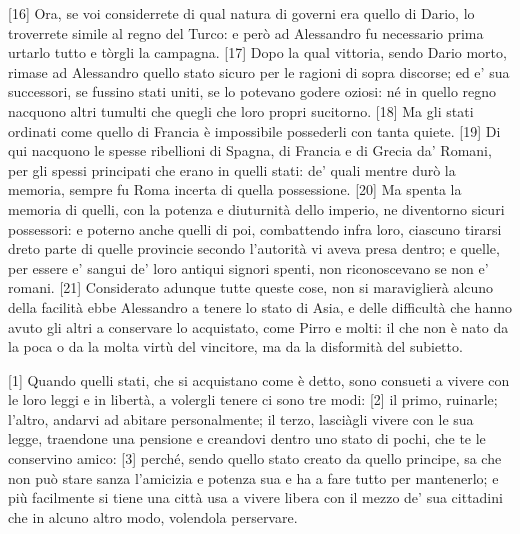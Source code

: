 {[}16{]} Ora, se voi considerrete di qual natura di governi era quello
di Dario, lo troverrete simile al regno del Turco: e però ad Alessandro
fu necessario prima urtarlo tutto e tòrgli la campagna. {[}17{]} Dopo la
qual vittoria, sendo Dario morto, rimase ad Alessandro quello stato
sicuro per le ragioni di sopra discorse; ed e' sua successori, se
fussino stati uniti, se lo potevano godere oziosi: né in quello regno
nacquono altri tumulti che quegli che loro propri sucitorno. {[}18{]} Ma
gli stati ordinati come quello di Francia è impossibile possederli con
tanta quiete. {[}19{]} Di qui nacquono le spesse ribellioni di Spagna,
di Francia e di Grecia da' Romani, per gli spessi principati che erano
in quelli stati: de' quali mentre durò la memoria, sempre fu Roma
incerta di quella possessione. {[}20{]} Ma spenta la memoria di quelli,
con la potenza e diuturnità dello imperio, ne diventorno sicuri
possessori: e poterno anche quelli di poi, combattendo infra loro,
ciascuno tirarsi dreto parte di quelle provincie secondo l'autorità vi
aveva presa dentro; e quelle, per essere e' sangui de' loro antiqui
signori spenti, non riconoscevano se non e' romani. {[}21{]} Considerato
adunque tutte queste cose, non si maraviglierà alcuno della facilità
ebbe Alessandro a tenere lo stato di Asia, e delle difficultà che hanno
avuto gli altri a conservare lo acquistato, come Pirro e molti: il che
non è nato da la poca o da la molta virtù del vincitore, ma da la
disformità del subietto.


{[}1{]} Quando quelli stati, che si acquistano come è detto, sono
consueti a vivere con le loro leggi e in libertà, a volergli tenere ci
sono tre modi: {[}2{]} il primo, ruinarle; l'altro, andarvi ad abitare
personalmente; il terzo, lasciàgli vivere con le sua legge, traendone
una pensione e creandovi dentro uno stato di pochi, che te le conservino
amico: {[}3{]} perché, sendo quello stato creato da quello principe, sa
che non può stare sanza l'amicizia e potenza sua e ha a fare tutto per
mantenerlo; e più facilmente si tiene una città usa a vivere libera con
il mezzo de' sua cittadini che in alcuno altro modo, volendola
perservare.

